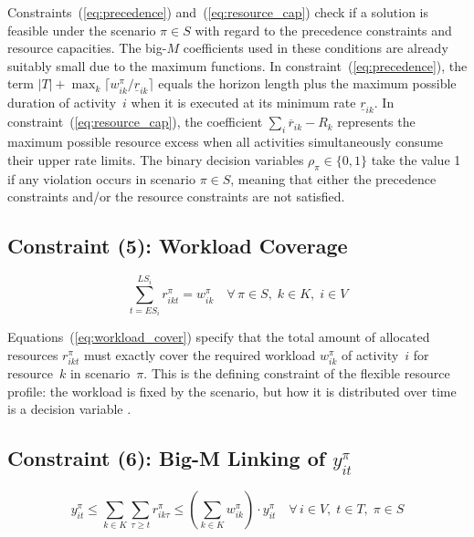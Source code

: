 Constraints~(\ref{eq:precedence}) and~(\ref{eq:resource_cap})
check if a solution is feasible under the scenario $\pi \in S$
with regard to the precedence constraints and resource
capacities. The big-$M$ coefficients used in these conditions are
already suitably small due to the maximum functions. In
constraint~(\ref{eq:precedence}), the term
$|T| + \max_{k} \lceil w_{ik}^{\pi} / \underline{r}_{ik} \rceil$
equals the horizon length plus the maximum possible duration of
activity~$i$ when it is executed at its minimum rate
$\underline{r}_{ik}$. In constraint~(\ref{eq:resource_cap}), the
coefficient $\sum_{i} \overline{r}_{ik} - R_k$ represents the
maximum possible resource excess when all activities
simultaneously consume their upper rate limits. The binary
decision variables $\rho_{\pi} \in \{0, 1\}$ take the value 1 if
any violation occurs in scenario $\pi \in S$, meaning that either
the precedence constraints and/or the resource constraints are not
satisfied.

\subsection*{Constraint (5): Workload Coverage}

\begin{equation}
    \sum_{t=ES_i}^{LS_i} r_{ikt}^{\pi}
    = w_{ik}^{\pi}
    \quad \forall\, \pi \in S,\;
    k \in K,\;
    i \in V
    \tag{5}
    \label{eq:workload_cover}
\end{equation}

Equations~(\ref{eq:workload_cover}) specify that the total amount
of allocated resources $r_{ikt}^{\pi}$ must exactly cover the
required workload $w_{ik}^{\pi}$ of activity~$i$ for resource~$k$
in scenario~$\pi$. This is the defining constraint of the
flexible resource profile: the workload is fixed by the scenario,
but how it is distributed over time is a decision variable
\parencite{Naber2014}.

\subsection*{Constraint (6): Big-M Linking of $y_{it}^{\pi}$}

\begin{equation}
    y_{it}^{\pi}
    \leq \sum_{k \in K} \sum_{\tau \geq t} r_{ik\tau}^{\pi}
    \leq \left(\sum_{k \in K} w_{ik}^{\pi}\right)
         \cdot y_{it}^{\pi}
    \quad \forall\, i \in V,\;
    t \in T,\;
    \pi \in S
    \tag{6}
    \label{eq:bigm}
\end{equation}

